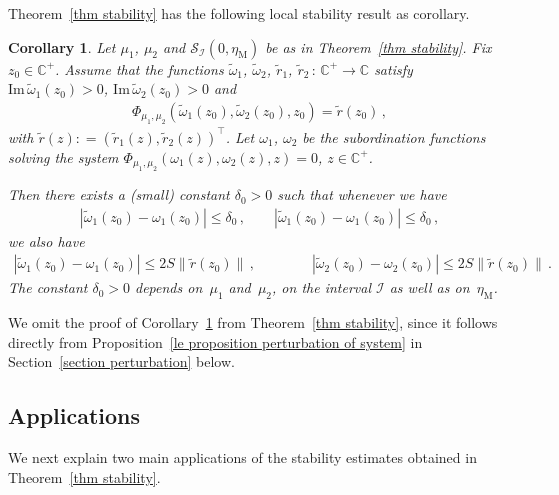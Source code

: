 \documentclass[10pt,reqno]{amsart}
\numberwithin{equation}{section}
\theoremstyle{plain}
\newtheorem{corollary}[theorem]{Corollary}
\numberwithin{kevin}{section}
\theoremstyle{remark}
\newcommand{\im}{\mathrm{Im}\,}
\newcommand{\C}{{\mathbb C}}
\newcommand{\deq}{\mathrel{\mathop:}=}
\newcommand{\PP}{\Phi}
\begin{document}
Theorem~\ref{thm stability} has the following local stability result as corollary.
\begin{corollary}\label{corollary perturbation}
Let $\mu_1$, $\mu_2$ and $\mathcal{S}_{\mathcal{I}}(0,\eta_{\mathrm{M}})$ be as in Theorem~\ref{thm stability}. Fix $z_0\in\C^+$. Assume that the functions $\widetilde\omega_1$, $\widetilde\omega_2$, $\widetilde{r}_1$, $\widetilde{r}_2\,:\,\C^+\rightarrow \C$ satisfy $\im\widetilde\omega_1(z_0)>0$, $\im\widetilde\omega_2(z_0)>0$ and 
\begin{align}
 \PP_{\mu_1,\mu_2}(\widetilde\omega_1(z_0),\widetilde\omega_2(z_0),z_0)=\widetilde r(z_0)\,,
\end{align}
with $\widetilde r(z)\deq(\widetilde r_1(z),\widetilde r_2(z))^\top$. Let $\omega_1$, $\omega_2$ be the subordination functions solving the system $\PP_{\mu_1,\mu_2}(\omega_1(z),\omega_2(z),z)=0$, $z\in\C^+$.

Then there exists a (small) constant $\delta_0>0$ such that whenever we have
\begin{align}\label{le huhu}
 |\widetilde\omega_1(z_0)-\omega_1(z_0)|\le\delta_0\,,\qquad |\widetilde\omega_1(z_0)-\omega_1(z_0)|\le \delta_0\,,
\end{align}
we also have
\begin{align}
 |\widetilde\omega_1(z_0)-\omega_1(z_0)|\le 2S\|\widetilde r(z_0)\|\,,\qquad\qquad |\widetilde\omega_2(z_0)-\omega_2(z_0)|\le 2S\|\widetilde r(z_0)\|\,.
\end{align}
The constant $\delta_0>0$ depends on~$\mu_1$ and~$\mu_2$, on the interval $\mathcal{I}$ as well as on~$\eta_{\mathrm{M}}$.
\end{corollary}
We omit the proof of Corollary~\ref{corollary perturbation} from Theorem~\ref{thm stability}, since it follows directly from Proposition~\ref{le proposition perturbation of system} in Section~\ref{section perturbation} below.

\subsection{Applications}
We next explain two main applications of the stability estimates obtained in Theorem~\ref{thm stability}.
\end{document}
